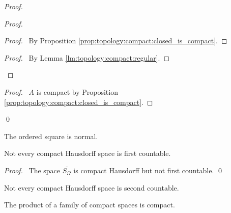 \begin{proof}
 \pf
 \begin{proof}
   \begin{proof}
     \pf\ By Proposition \ref{prop:topology:compact:closed_is_compact}.
   \end{proof}
   \qedstep
   \begin{proof}
     \pf\ By Lemma \ref{lm:topology:compact:regular}.
   \end{proof}
 \end{proof}
 \begin{proof}
   \pf\ $A$ is compact by Proposition
   \ref{prop:topology:compact:closed_is_compact}.
 \end{proof}
 \qed
\end{proof}

\begin{cor}
 The ordered square is normal.
\end{cor}

\begin{prop}
  Not every compact Hausdorff space is first countable.
\end{prop}

\begin{proof}
  \pf\ The space $\overline{S_\Omega}$ is compact Hausdorff but not first countable. \qed
\end{proof}

\begin{cor}
Not every compact Hausdorff space is second countable.
\end{cor}

\begin{thm}[Tychonoff (AC)]
The product of a family of compact spaces is compact.
\end{thm}

